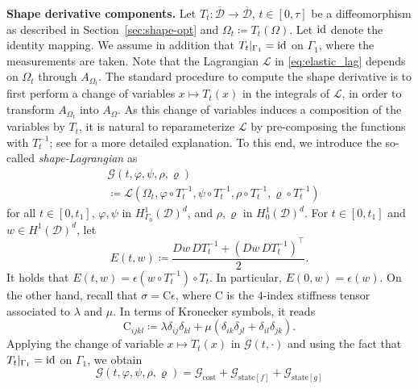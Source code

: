 \documentclass[iicol,pdflatex,sn-mathphys-ay]{sn-jnl}%
\theoremstyle{thmstyleone}%
\theoremstyle{thmstyletwo}%
\theoremstyle{thmstylethree}%
\begin{document}
\textbf{Shape derivative components.}
Let $T_t:\overline{\mathcal{D}}\to\overline{\mathcal{D}}$,
$t\in [0,\tau]$ be a diffeomorphism as described in
Section~\ref{sec:shape-opt} and $\Omega_t \coloneqq T_t(\Omega)$.
Let $\rm{id}$ denote the identity mapping.
We assume in addition that $T_t|_{\Gamma_1}=\rm{id}$ on $\Gamma_1$,
where the measurements are taken.
Note that the Lagrangian $\mathcal{L}$ in \eqref{eq:elastic_lag}
depends on $\Omega_t$  through $A_{\Omega_t}$.
The standard procedure to compute the shape derivative is to
first perform a change of variables $x\mapsto T_t(x)$ in
the integrals of $\mathcal{L}$, in order to transform
$A_{\Omega_t}$ into $A_{\Omega}$.
As this change of variables induces a composition
of the variables by $T_t$, it is natural to reparameterize $\mathcal{L}$
by pre-composing the functions with $T_t^{-1}$; see \cite{MR4531392}
for a more detailed explanation. 
To this end, we introduce the so-called {\it shape-Lagrangian} as
\begin{align*}
	& \mathcal{G}(t,\varphi,\psi,\rho,\varrho) \\
	& \coloneqq \mathcal{L}\left(\Omega_{t},\varphi\circ T_{t}^{-1},\psi\circ T_{t}^{-1},\rho\circ T_{t}^{-1},\varrho\circ T_{t}^{-1}\right)
\end{align*}
for all $t\in[0, t_1]$, $\varphi,\psi$ in $H^1_{\Gamma_0}(\mathcal{D})^d$, and $\rho,\varrho$ in $H^1_0(\mathcal{D})^d$.
For $t\in[0, t_1]$ and $w \in H^1(\mathcal{D})^d$, let
\begin{equation*}
	E(t,w)\coloneqq\frac{Dw\,DT_{t}^{-1}+(Dw\,DT_{t}^{-1})^{\top}}{2}.
\end{equation*}
It holds that $E(t,w) = \epsilon\left(w\circ T_{t}^{-1}\right)\circ T_{t}$.
In particular, $E(0, w) = \epsilon(w)$.
On the other hand, recall that $\sigma = \mathrm{C}\epsilon$,
where $\mathrm{C}$ is the $4$-index stiffness tensor associated to
$\lambda$ and $\mu$. In terms of Kronecker symbols, it reads
\begin{equation}
	\mathrm{C}_{ijkl} \coloneqq \lambda \delta_{ij} \delta_{kl} + \mu(\delta_{ik}\delta_{jl} + \delta_{il}\delta_{jk}).
\end{equation}
Applying the change of variable $x \mapsto T_t(x)$ in $\mathcal{G}(t,\cdot)$ and using the fact that $T_t|_{\Gamma_1}=\rm{id}$ on $\Gamma_1$, we obtain
\begin{equation}
	\mathcal{G}(t,\varphi,\psi,\rho,\varrho) =
	\mathcal{G}_{\mathrm{cost}} +
	\mathcal{G}_{\mathrm{state}[f]} +
	\mathcal{G}_{\mathrm{state}[g]}
\end{equation}
\end{document}
